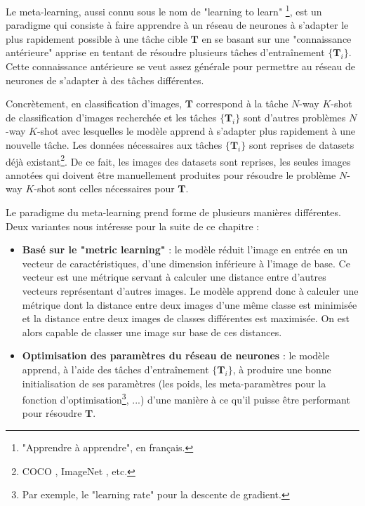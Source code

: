 Le meta-learning, aussi connu sous le nom de "learning to learn" \footnote{"Apprendre à apprendre", en français.}, est un paradigme qui consiste à faire apprendre à un réseau de neurones à s'adapter le plus rapidement possible à une tâche cible $\textbf{T}$ en se basant sur une "connaissance antérieure" apprise en tentant de résoudre plusieurs tâches d'entraînement $\{\textbf{T}_i\}$. Cette connaissance antérieure se veut assez générale pour permettre au réseau de neurones de s'adapter à des tâches différentes.

Concrètement, en classification d'images, $\textbf{T}$ correspond à la tâche $N$-way $K$-shot de classification d'images recherchée et les tâches $\{\textbf{T}_i\}$ sont d'autres problèmes $N$-way $K$-shot avec lesquelles le modèle apprend à s'adapter plus rapidement à une nouvelle tâche. Les données nécessaires aux tâches $\{\textbf{T}_i\}$ sont reprises de datasets déjà existant\footnote{COCO \cite{COCO}, ImageNet \cite{ILSVRC15}, etc.}. De ce fait, les images des datasets sont reprises, les seules images annotées qui doivent être manuellement produites pour résoudre le problème $N$-way $K$-shot sont celles nécessaires pour $\textbf{T}$.

Le paradigme du meta-learning prend forme de plusieurs manières différentes. Deux variantes nous intéresse pour la suite de ce chapitre :
\begin{itemize}
    \item \textbf{Basé sur le "metric learning"} \cite{prototypical-networks, matching-networks, koch2015siamese, relation-net-fsl} : le modèle réduit l'image en entrée en un vecteur de caractéristiques, d'une dimension inférieure à l'image de base. Ce vecteur est une métrique servant à calculer une distance entre d'autres vecteurs représentant d'autres images. Le modèle apprend donc à calculer une métrique dont la distance entre deux images d'une même classe est minimisée et la distance entre deux images de classes différentes est maximisée. On est alors capable de classer une image sur base de ces distances.
    \item \textbf{Optimisation des paramètres du réseau de neurones} \cite{MAML, Meta-SGD} : le modèle apprend, à l'aide des tâches d'entraînement $\{\textbf{T}_i\}$, à produire une bonne initialisation de ses paramètres (les poids, les meta-paramètres pour la fonction d'optimisation\footnote{Par exemple, le "learning rate" pour la descente de gradient.}, ...) d'une manière à ce qu'il puisse être performant pour résoudre $\textbf{T}$.
\end{itemize}

